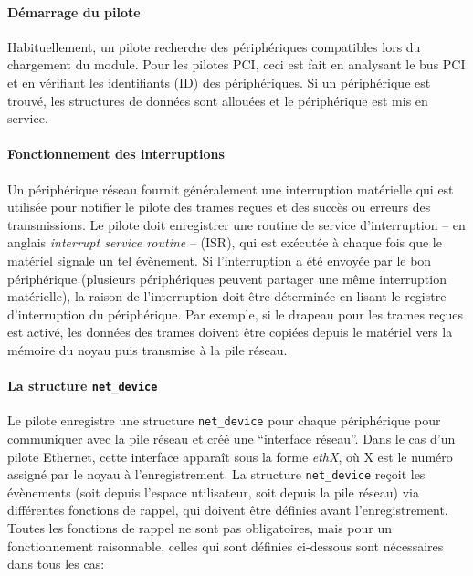 \documentclass[a4paper,12pt,BCOR=6mm,bibtotoc,idxtotoc]{scrbook}
\begin{document}
\paragraph{D\'emarrage du pilote} Habituellement, un pilote recherche
des p\'eriph\'eriques compatibles lors du chargement du module.  Pour
les pilotes PCI, ceci est fait en analysant le bus PCI et en
v\'erifiant les identifiants (ID) des p\'eriph\'eriques.  Si un
p\'eriph\'erique est trouv\'e, les structures de donn\'ees sont
allou\'ees et le p\'eriph\'erique est mis en service.

\paragraph{Fonctionnement des interruptions} Un
p\'eriph\'erique r\'eseau fournit g\'en\'eralement une interruption
mat\'erielle qui est utilis\'ee pour notifier le pilote des trames
re\c{c}ues et des succ\`es ou erreurs des transmissions. Le pilote
doit enregistrer une routine de service d'interruption -- en anglais
\textit{interrupt service routine} --
(ISR), qui est
ex\'ecut\'ee \`a chaque fois que le mat\'eriel signale un tel
\'ev\`enement.  Si l'interruption a \'et\'e envoy\'ee par le bon
p\'eriph\'erique (plusieurs p\'eriph\'eriques peuvent partager une
m\^eme interruption mat\'erielle), la raison de l'interruption doit
\^etre d\'etermin\'ee en lisant le registre d'interruption du
p\'eriph\'erique.  Par exemple, si le drapeau pour les trames
re\c{c}ues est activ\'e, les donn\'ees des trames doivent \^etre
copi\'ees depuis le mat\'eriel vers la m\'emoire du noyau puis
transmise \`a la pile r\'eseau.

\paragraph{La structure \lstinline+net_device+} Le
pilote enregistre une structure \lstinline+net_device+ pour chaque
p\'eriph\'erique pour communiquer avec la pile r\'eseau et cr\'e\'e
une ``interface r\'eseau''.  Dans le cas d'un pilote Ethernet, cette
interface appara\^it sous la forme \textit{ethX}, o\`u X est le
num\'ero assign\'e par le noyau \`a l'enregistrement. La structure
\lstinline+net_device+ re\c{c}oit les \'ev\`enements (soit depuis
l'espace utilisateur, soit depuis la pile r\'eseau) via diff\'erentes
fonctions de rappel, qui doivent \^etre d\'efinies avant
l'enregistrement.  Toutes les fonctions de rappel ne sont pas
obligatoires, mais pour un fonctionnement raisonnable, celles qui sont
d\'efinies ci-dessous sont n\'ecessaires dans tous les cas:
\end{document}
